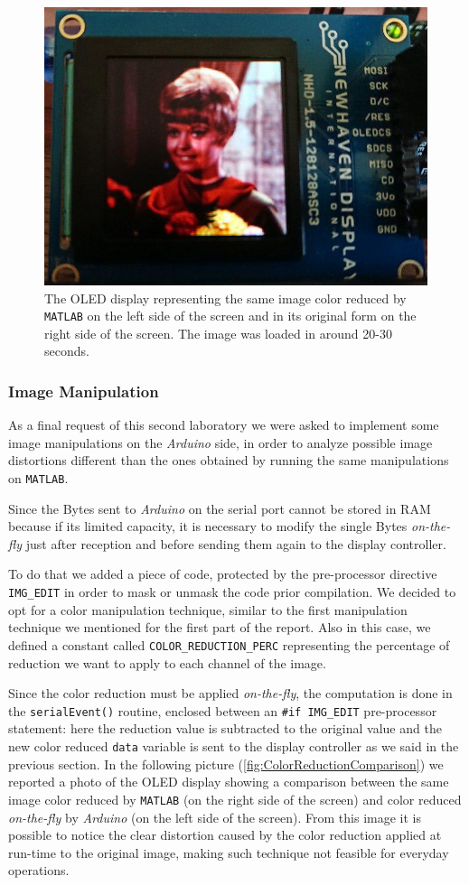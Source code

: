 \documentclass[a4paper]{article}
\begin{document}
            \begin{figure}[htp]
                \centering
                \includegraphics[width=0.4 \columnwidth]{./screenshots/OriginalImageArduino}
                \caption{
                        \label{fig:OriginalImageArduino}
                        The OLED display representing the same image color reduced by \texttt{MATLAB} on the left side of the screen and in its original form on the right side of the screen. The image was loaded in around 20-30 seconds.
                }
            \end{figure}

        \subsubsection{Image Manipulation}
            As a final request of this second laboratory we were asked to implement some image manipulations on the \emph{Arduino} side, in order to analyze possible image distortions different than the ones obtained by running the same manipulations on \texttt{MATLAB}. 
            
            Since the Bytes sent to \emph{Arduino} on the serial port cannot be stored in RAM because if its limited capacity, it is necessary to modify the single Bytes \emph{on-the-fly} just after reception and before sending them again to the display controller.

            To do that we added a piece of code, protected by the pre-processor directive \texttt{IMG\_EDIT} in order to mask or unmask the code prior compilation. 
            We decided to opt for a color manipulation technique, similar to the first manipulation technique we mentioned for the first part of the report. Also in this case, we defined a constant called \texttt{COLOR\_REDUCTION\_PERC} representing the percentage of reduction we want to apply to each channel of the image.

            Since the color reduction must be applied \emph{on-the-fly}, the computation is done in the \texttt{serialEvent()} routine, enclosed between an \texttt{\#if IMG\_EDIT} pre-processor statement: here the reduction value is subtracted to the original value and the new color reduced \texttt{data} variable is sent to the display controller as we said in the previous section. In the following picture (\ref{fig:ColorReductionComparison}) we reported a photo of the OLED display showing a comparison between the same image color reduced by \texttt{MATLAB} (on the right side of the screen) and color reduced \emph{on-the-fly} by \emph{Arduino} (on the left side of the screen).
            From this image it is possible to notice the clear distortion caused by the color reduction applied at run-time to the original image, making such technique not feasible for everyday operations.
\end{document}
